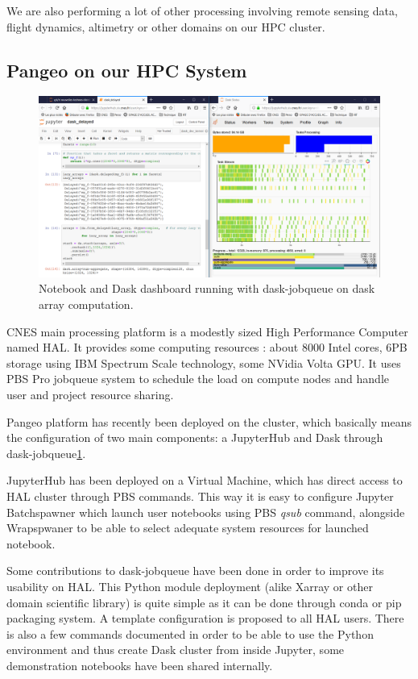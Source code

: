 \documentclass{article}
\begin{document}
We are also performing a lot of other processing involving remote sensing data, flight dynamics, altimetry or other domains on our HPC cluster.

\subsection{Pangeo on our HPC System}
\label{ssec:pangeohpc}

\begin{figure}
  \centering
  \includegraphics[width=\columnwidth]{dask_jobqueue.png}
  \caption{\label{dask_jobqueue} Notebook and Dask dashboard running with dask-jobqueue on dask array computation.}
\end{figure}

CNES main processing platform is a modestly sized High Performance Computer named HAL. It provides some computing resources : about 8000 Intel cores, 6PB storage using IBM Spectrum Scale technology, some NVidia Volta GPU. It uses PBS Pro jobqueue system to schedule the load on compute nodes and handle user and project resource sharing.

Pangeo platform has recently been deployed on the cluster, which basically means the configuration of two main components: a JupyterHub and Dask through dask-jobqueue\ref{dask_jobqueue}.

JupyterHub has been deployed on a Virtual Machine, which has direct access to HAL cluster through PBS commands. This way it is easy to configure Jupyter Batchspawner which launch user notebooks using PBS \textit{qsub} command, alongside Wrapspwaner to be able to select adequate system resources for launched notebook. 

Some contributions to dask-jobqueue have been done in order to improve its usability on HAL. This Python module deployment (alike Xarray or other domain scientific library) is quite simple as it can be done through conda or pip packaging system. A template configuration is proposed to all HAL users. There is also a few commands documented in order to be able to use the Python environment and thus create Dask cluster from inside Jupyter, some demonstration notebooks have been shared internally.
\end{document}

